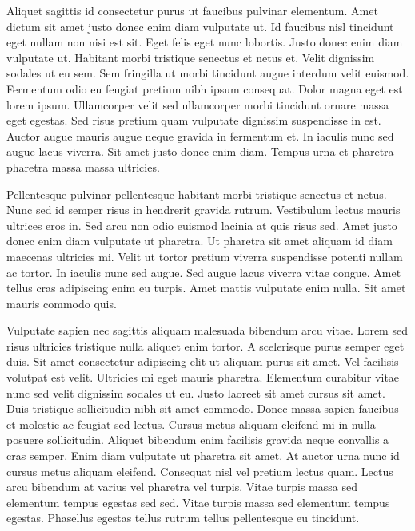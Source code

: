 \documentclass[11pt,a4paper]{article}
\begin{document}
Aliquet sagittis id consectetur purus ut faucibus pulvinar elementum. Amet dictum sit amet justo donec enim diam vulputate ut. Id faucibus nisl tincidunt eget nullam non nisi est sit. Eget felis eget nunc lobortis. Justo donec enim diam vulputate ut. Habitant morbi tristique senectus et netus et. Velit dignissim sodales ut eu sem. Sem fringilla ut morbi tincidunt augue interdum velit euismod. Fermentum odio eu feugiat pretium nibh ipsum consequat. Dolor magna eget est lorem ipsum. Ullamcorper velit sed ullamcorper morbi tincidunt ornare massa eget egestas. Sed risus pretium quam vulputate dignissim suspendisse in est. Auctor augue mauris augue neque gravida in fermentum et. In iaculis nunc sed augue lacus viverra. Sit amet justo donec enim diam. Tempus urna et pharetra pharetra massa massa ultricies.

Pellentesque pulvinar pellentesque habitant morbi tristique senectus et netus. Nunc sed id semper risus in hendrerit gravida rutrum. Vestibulum lectus mauris ultrices eros in. Sed arcu non odio euismod lacinia at quis risus sed. Amet justo donec enim diam vulputate ut pharetra. Ut pharetra sit amet aliquam id diam maecenas ultricies mi. Velit ut tortor pretium viverra suspendisse potenti nullam ac tortor. In iaculis nunc sed augue. Sed augue lacus viverra vitae congue. Amet tellus cras adipiscing enim eu turpis. Amet mattis vulputate enim nulla. Sit amet mauris commodo quis.

Vulputate sapien nec sagittis aliquam malesuada bibendum arcu vitae. Lorem sed risus ultricies tristique nulla aliquet enim tortor. A scelerisque purus semper eget duis. Sit amet consectetur adipiscing elit ut aliquam purus sit amet. Vel facilisis volutpat est velit. Ultricies mi eget mauris pharetra. Elementum curabitur vitae nunc sed velit dignissim sodales ut eu. Justo laoreet sit amet cursus sit amet. Duis tristique sollicitudin nibh sit amet commodo. Donec massa sapien faucibus et molestie ac feugiat sed lectus. Cursus metus aliquam eleifend mi in nulla posuere sollicitudin. Aliquet bibendum enim facilisis gravida neque convallis a cras semper. Enim diam vulputate ut pharetra sit amet. At auctor urna nunc id cursus metus aliquam eleifend. Consequat nisl vel pretium lectus quam. Lectus arcu bibendum at varius vel pharetra vel turpis. Vitae turpis massa sed elementum tempus egestas sed sed. Vitae turpis massa sed elementum tempus egestas. Phasellus egestas tellus rutrum tellus pellentesque eu tincidunt.
\end{document}
